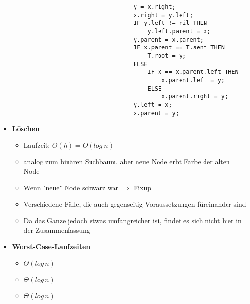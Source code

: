 \begin{itemize}
\begin{itemize}
\begin{itemize}
\begin{verbatim}
                            y = x.right;
                            x.right = y.left;
                            IF y.left != nil THEN
                                y.left.parent = x;
                            y.parent = x.parent;
                            IF x.parent == T.sent THEN
                                T.root = y;
                            ELSE
                                IF x == x.parent.left THEN
                                    x.parent.left = y;
                                ELSE
                                    x.parent.right = y;
                            y.left = x;
                            x.parent = y;
                            \end{verbatim}
                    \end{itemize}
            \end{itemize}

        \item \textbf{Löschen}
            \begin{itemize}
                \item Laufzeit: $O(h) = O(log~n)$
                \item analog zum binären Suchbaum, aber neue Node erbt Farbe der alten Node
                \item Wenn "neue" Node schwarz war $\Rightarrow$ Fixup
                \item Verschiedene Fälle, die auch gegenseitig Voraussetzungen füreinander sind 
                \item Da das Ganze jedoch etwas umfangreicher ist, findet es sich nicht hier in der Zusammenfassung
            \end{itemize}
        
        \item \textbf{Worst-Case-Laufzeiten}
            \begin{itemize}
                \item {} $\Theta(log~n)$
                \item {} $\Theta(log~n)$
                \item {} $\Theta(log~n)$
            \end{itemize}
    \end{itemize}

